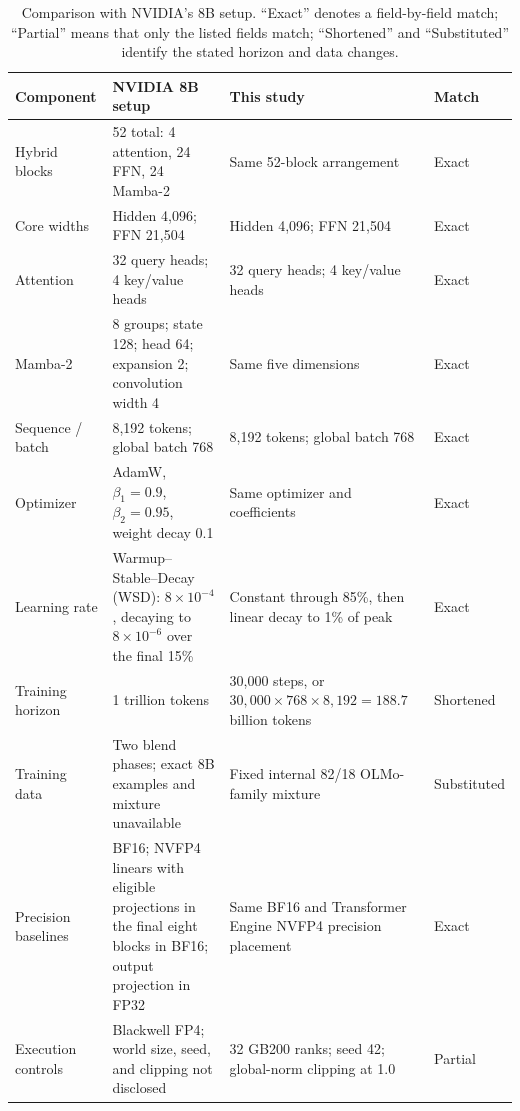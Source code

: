 \documentclass[11pt]{article}
\newcommand{\nv}{NVFP4}
\begin{document}
\begin{table}[H]
  \centering
  \scriptsize
  \caption{Comparison with NVIDIA's 8B setup.  ``Exact'' denotes a
  field-by-field match; ``Partial'' means that only the listed fields match;
  ``Shortened'' and ``Substituted'' identify the stated horizon and data
  changes.}
  \label{tab:setup}
  \begin{tabularx}{\textwidth}{@{}p{}YYp{0.12\textwidth}@{}}
    \toprule
    Component & NVIDIA 8B setup & This study & Match \\
    \midrule
    Hybrid blocks
      & 52 total: 4 attention, 24 FFN, 24 Mamba-2
      & Same 52-block arrangement
      & Exact \\
    Core widths
      & Hidden 4,096; FFN 21,504
      & Hidden 4,096; FFN 21,504
      & Exact \\
    Attention
      & 32 query heads; 4 key/value heads
      & 32 query heads; 4 key/value heads
      & Exact \\
    Mamba-2
      & 8 groups; state 128; head 64; expansion 2; convolution width 4
      & Same five dimensions
      & Exact \\
    Sequence / batch
      & 8,192 tokens; global batch 768
      & 8,192 tokens; global batch 768
      & Exact \\
    Optimizer
      & AdamW, $\beta_1=0.9$, $\beta_2=0.95$, weight decay 0.1
      & Same optimizer and coefficients
      & Exact \\
    Learning rate
      & Warmup--Stable--Decay (WSD): $8\times10^{-4}$, decaying to $8\times10^{-6}$ over the final 15\%
      & Constant through 85\%, then linear decay to 1\% of peak
      & Exact \\
    Training horizon
      & 1 trillion tokens
      & 30,000 steps, or
        $30{,}000\times768\times8{,}192=188.7$ billion tokens
      & Shortened \\
    Training data
      & Two blend phases; exact 8B examples and mixture unavailable
      & Fixed internal 82/18 OLMo-family mixture
      & Substituted \\
    Precision baselines
      & BF16; \nv{} linears with eligible projections in the final eight blocks in BF16;
        output projection in FP32
      & Same BF16 and Transformer Engine \nv{} precision placement
      & Exact \\
    Execution controls
      & Blackwell FP4; world size, seed, and clipping not disclosed
      & 32 GB200 ranks; seed 42; global-norm clipping at 1.0
      & Partial \\
    \bottomrule
  \end{tabularx}
\end{table}
\end{document}

